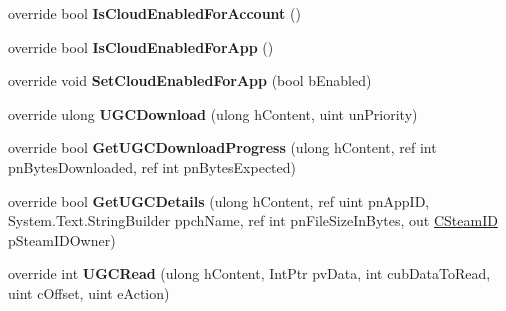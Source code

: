 \begin{DoxyCompactItemize}
\mbox{\label{class_valve_1_1_steamworks_1_1_c_steam_remote_storage_a3c2d9128e0202ea23feeca8659db544d}} 
override bool {\bfseries Is\+Cloud\+Enabled\+For\+Account} ()
\item 
\mbox{\label{class_valve_1_1_steamworks_1_1_c_steam_remote_storage_a3285196b70484523c3437e260e33d061}} 
override bool {\bfseries Is\+Cloud\+Enabled\+For\+App} ()
\item 
\mbox{\label{class_valve_1_1_steamworks_1_1_c_steam_remote_storage_a4e132e15729b8b74cb54186077e85e50}} 
override void {\bfseries Set\+Cloud\+Enabled\+For\+App} (bool b\+Enabled)
\item 
\mbox{\label{class_valve_1_1_steamworks_1_1_c_steam_remote_storage_a720d4701631b54a0edb611cbfdc01c48}} 
override ulong {\bfseries U\+G\+C\+Download} (ulong h\+Content, uint un\+Priority)
\item 
\mbox{\label{class_valve_1_1_steamworks_1_1_c_steam_remote_storage_aec53eb39d92d27a862b8a22edd54b93d}} 
override bool {\bfseries Get\+U\+G\+C\+Download\+Progress} (ulong h\+Content, ref int pn\+Bytes\+Downloaded, ref int pn\+Bytes\+Expected)
\item 
\mbox{\label{class_valve_1_1_steamworks_1_1_c_steam_remote_storage_a502a0d3c3bfee0fd1e842ec9d151ef7f}} 
override bool {\bfseries Get\+U\+G\+C\+Details} (ulong h\+Content, ref uint pn\+App\+ID, System.\+Text.\+String\+Builder ppch\+Name, ref int pn\+File\+Size\+In\+Bytes, out \hyperlink{struct_valve_1_1_steamworks_1_1_c_steam_i_d}{C\+Steam\+ID} p\+Steam\+I\+D\+Owner)
\item 
\mbox{\label{class_valve_1_1_steamworks_1_1_c_steam_remote_storage_a45bba73c094d2a4adab50ced4aebf8e0}} 
override int {\bfseries U\+G\+C\+Read} (ulong h\+Content, Int\+Ptr pv\+Data, int cub\+Data\+To\+Read, uint c\+Offset, uint e\+Action)
\item 
\mbox{\label{class_valve_1_1_steamworks_1_1_c_steam_remote_storage_a4a4c510da863ea6a34aadf736bdceb9a}} 

\end{DoxyCompactItemize}
